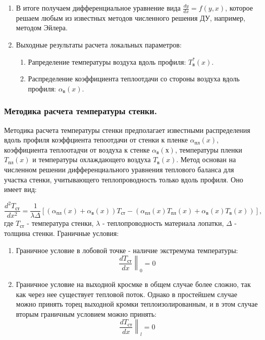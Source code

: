 \documentclass[a4paper,12pt]{article}
\begin{document}
\begin{enumerate}
        \item В итоге получаем дифференциальное уравнение вида $\frac{dy}{dx} = f(y, x)$, которое решаем любым из
        известных методов численного решения ДУ, например, методом Эйлера.

        \item Выходные результаты расчета локальных параметров:

        \begin{enumerate}
            \item Рапределение температуры воздуха вдоль профиля: $T_в^*(x)$.
            \item Распределение коэффициента теплоотдачи со стороны воздуха вдоль профиля: $\alpha_в (x)$.
        \end{enumerate}

    \end{enumerate}

%    
    \subsubsection{Методика расчета температуры стенки.}
%    
    Методика расчета температуры стенки предполагает известными распределения вдоль профиля коэффциента
    тепоотдачи от стенки к пленке $\alpha_{пл}(x)$, коэффициента теплоотадчи от воздуха к стенке $\alpha_в(х)$,
    температуры пленки $T_{пл}(x)$ и температуры охлаждающего воздуха $T_в(x)$.
    Метод основан на численном решении дифференциального уравнения теплового баланса для участка стенки,
    учитывающего теплопроводность только вдоль профиля.
    Оно имеет вид:

    \[
        \frac{d^2 T_{ст}}{dx^2} = \frac{1}{\lambda \Delta} \left[
                    \left( \alpha_{пл}(x) + \alpha_в(x) \right) T_{ст} -
                    \left( \alpha_{пл}(x) T_{пл}(x) + \alpha_в(x) T_в(x) \right)
        \right],
    \]
    где $T_{ст}$ - температура стенки, $\lambda$ - теплопроводность материала лопатки, $\Delta$ - толщина стенки.
    Граничные условия:

    \begin{enumerate}
        \item Граничное условие в лобовой точке - наличие экстремума температуры:
        \[
            \left. \frac{dT_{ст}}{dx} \right\|_0 = 0
        \]

        \item Граничное условие на выходной кросмке в общем случае более сложно, так как через нее
        существует тепловой поток. Однако в простейшем случае можно принять торец выходной кромки теплоизолированным,
        и в этом случае вторым граничным условием можно принять:
        \[
            \left. \frac{dT_{ст}}{dx} \right\|_l = 0
        \]
    \end{enumerate}
\end{document}

